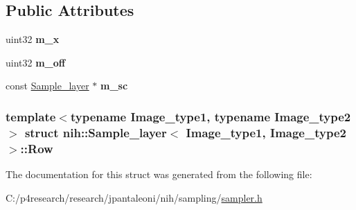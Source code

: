 \subsection*{\-Public \-Attributes}
\begin{DoxyCompactItemize}
\item 
\hypertarget{structnih_1_1_sample__layer_1_1_row_acfe4a8db4de933753d4135cba868d414}{
uint32 {\bfseries m\-\_\-x}}
\label{structnih_1_1_sample__layer_1_1_row_acfe4a8db4de933753d4135cba868d414}

\item 
\hypertarget{structnih_1_1_sample__layer_1_1_row_ae0414bf1ec4b7a942efb541b19de908f}{
uint32 {\bfseries m\-\_\-off}}
\label{structnih_1_1_sample__layer_1_1_row_ae0414bf1ec4b7a942efb541b19de908f}

\item 
\hypertarget{structnih_1_1_sample__layer_1_1_row_a7ebb951d8fa68fb6b78bcc710195bbcd}{
const \hyperlink{classnih_1_1_sample__layer}{\-Sample\-\_\-layer} $\ast$ {\bfseries m\-\_\-sc}}
\label{structnih_1_1_sample__layer_1_1_row_a7ebb951d8fa68fb6b78bcc710195bbcd}

\end{DoxyCompactItemize}
\subsubsection*{template$<$typename Image\-\_\-type1, typename Image\-\_\-type2$>$ struct nih\-::\-Sample\-\_\-layer$<$ Image\-\_\-type1, Image\-\_\-type2 $>$\-::\-Row}



\-The documentation for this struct was generated from the following file\-:\begin{DoxyCompactItemize}
\item 
\-C\-:/p4research/research/jpantaleoni/nih/sampling/\hyperlink{sampler_8h}{sampler.\-h}\end{DoxyCompactItemize}
